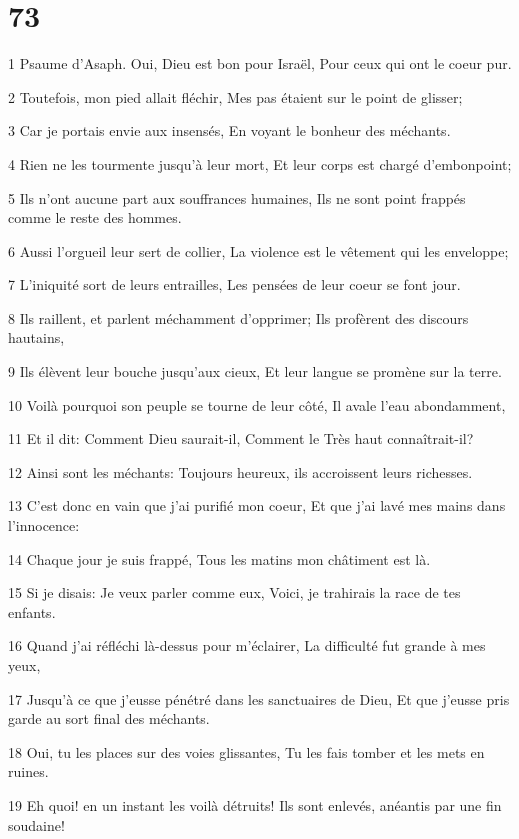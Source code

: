 \chapter{73}

\par 1 Psaume d'Asaph. Oui, Dieu est bon pour Israël, Pour ceux qui ont le coeur pur.
\par 2 Toutefois, mon pied allait fléchir, Mes pas étaient sur le point de glisser;
\par 3 Car je portais envie aux insensés, En voyant le bonheur des méchants.
\par 4 Rien ne les tourmente jusqu'à leur mort, Et leur corps est chargé d'embonpoint;
\par 5 Ils n'ont aucune part aux souffrances humaines, Ils ne sont point frappés comme le reste des hommes.
\par 6 Aussi l'orgueil leur sert de collier, La violence est le vêtement qui les enveloppe;
\par 7 L'iniquité sort de leurs entrailles, Les pensées de leur coeur se font jour.
\par 8 Ils raillent, et parlent méchamment d'opprimer; Ils profèrent des discours hautains,
\par 9 Ils élèvent leur bouche jusqu'aux cieux, Et leur langue se promène sur la terre.
\par 10 Voilà pourquoi son peuple se tourne de leur côté, Il avale l'eau abondamment,
\par 11 Et il dit: Comment Dieu saurait-il, Comment le Très haut connaîtrait-il?
\par 12 Ainsi sont les méchants: Toujours heureux, ils accroissent leurs richesses.
\par 13 C'est donc en vain que j'ai purifié mon coeur, Et que j'ai lavé mes mains dans l'innocence:
\par 14 Chaque jour je suis frappé, Tous les matins mon châtiment est là.
\par 15 Si je disais: Je veux parler comme eux, Voici, je trahirais la race de tes enfants.
\par 16 Quand j'ai réfléchi là-dessus pour m'éclairer, La difficulté fut grande à mes yeux,
\par 17 Jusqu'à ce que j'eusse pénétré dans les sanctuaires de Dieu, Et que j'eusse pris garde au sort final des méchants.
\par 18 Oui, tu les places sur des voies glissantes, Tu les fais tomber et les mets en ruines.
\par 19 Eh quoi! en un instant les voilà détruits! Ils sont enlevés, anéantis par une fin soudaine!
